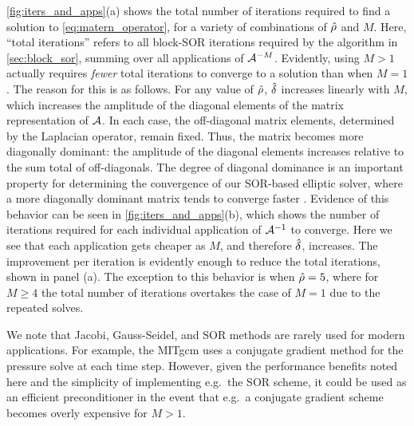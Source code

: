 \cref{fig:iters_and_apps}(a) shows the total number of iterations required to
find a solution to \cref{eq:matern_operator}, for a variety of combinations of
$\hat{\rho}$ and $M$.
Here, ``total iterations'' refers to all block-SOR iterations
required by the algorithm in \cref{sec:block_sor}, summing over all applications
of $\mathcal{A}^{-M}$.
Evidently, using $M>1$ actually requires \textit{fewer} total iterations to converge to a
solution than when $M=1$.
The reason for this is as follows.
For any value of $\hat{\rho}$, $\hat{\delta}$ increases linearly with $M$, which
increases the amplitude of the diagonal elements of the matrix representation of
$\mathcal{A}$.
In each case, the off-diagonal matrix elements, determined by the Laplacian
operator, remain fixed.
Thus, the matrix becomes more diagonally dominant:
the amplitude of the diagonal elements increases relative to the sum total of
off-diagonals.
The degree of diagonal dominance is an important property for
determining the convergence of our SOR-based elliptic solver, where a more
diagonally dominant matrix tends to converge faster \citep{golub_matrix_2013}.
Evidence of this behavior can be seen in \cref{fig:iters_and_apps}(b), which shows the
number of iterations required for each individual application of
$\mathcal{A}^{-1}$ to converge.
Here we see that each application gets cheaper as $M$, and therefore $\hat{\delta}$,
increases.
The improvement per iteration is evidently enough to reduce the total
iterations, shown in panel (a).
The exception to this behavior is when $\hat{\rho} = 5$, where for $M\ge 4$
the total number of iterations overtakes the case of $M=1$ due to the repeated
solves.

We note that Jacobi, Gauss-Seidel, and SOR methods are rarely used for modern
applications.
For example, the MITgcm
\citep{marshall_finite-volume_1997,campin_mitgcmmitgcm_2021}
uses a conjugate gradient method for the pressure solve at each time
step.
However, given the performance benefits noted here and the simplicity of
implementing e.g.\ the SOR scheme, it could be used as an efficient
preconditioner in the event that e.g.\ a conjugate gradient scheme becomes
overly expensive for $M>1$.

